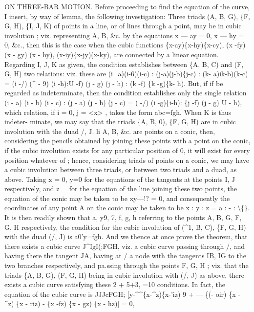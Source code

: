 \documentclass[12pt,a4paper]{article}
\begin{document}
ON THREE-BAR MOTION.
Before
proceeding
to
find
the
equation
of
the
curve,
I
insert,
by way of lemma,
the
following
investigation:
Three
triads
(A,
B,
G),
\{F,
G,
H),
\{I,
J, K)
of
points
in
a
line,
or
of
lines
through
a
point,
may
be
in
cubic
involution
;
viz.
representing A,
B,
\&c.
by
the
equations x --- ay = 0, x --- hy = 0,
\&c., then
this
is
the
case when the cubic
functions
\{x-ay)\{x-hy)\{x-cy),
(x -fy) (x - gy) (x - hy),
(x-iy)\{x-jy)(x-ky),
are
connected
by
a
linear
equation.
Regarding
I,
J, K
as
given,
the
condition
establishes between
\{A, B,
C) and
(F,
G, H) two
relations:
viz.
these
are
(i\_a)(i-6)(i-c)
: (j-a)(j-b)\{j-c)
: (k- a)ik-b)(k-c)
= (i -/) (\textasciicircum{} - 9) (i -h):U -f) (j - g) (j - h)
: (k -f) \{k -g)\{k- h).
But,
if
if
be
regarded
as
indeterminate,
then
the
condition
establishes
only
the
single
relation
(i - a) (i - b) (i - c)
:
(j - a) (j - b) (j - c)
=
(\guillemotright{}\textbullet{} -/) (i -g)\{i-h):
\{j -f) (j - g) U - h),
which
relation,
if
i = 0, j =
<x>
,
takes
the
form
abc=fgh.
When K
is
thus
indeter-
minate, we
may
say
that
the
triads
\{A,
B,
0),
\{F,
G, H)
are
in
cubic
involution
with the duad
/,
J.
li A,
B,
\&c.
are
points
on
a
conic,
then,
considering
the
pencils
obtained
by
joining
these
points
with
a
point
on
the
conic,
if
the
cubic
involution
exists
for
any
particular
position
of
0,
it
will
exist
for
every
position
whatever
of
;
hence,
considering
triads
of
points
on
a
conic, we
may
have
a
cubic
involution
between
three
triads, or between two
triads and a duad,
as above.
Taking x = 0, y=0
for the equations of the tangents at the points
I, J respectively,
and
z =
for
the
equation
of
the
line
joining
these
two
points,
the
equation
of
the
conic may
be
taken
to
be xy---!? = 0,
and
consequently
the
coordinates
of
any
point
A
on
the
conic may be
taken to
be
x
: y
: z = a
: -
:
\textbackslash\{\}.
It
is
then
readily
shown
that
a,
y9,
7, f, g, h referring
to
the
points A, B,
G, F,
G, H respectively, the condition
for the cubic involution
of (\textasciicircum{}1, B,
C), \{F,
G, H) with the duad
(/, J)
is a0'y=fgh.
And
we
thence
at
once
prove
the
theorem,
that
there
exists
a
cubic
curve
J\textasciicircum{}IgI(;FGH,
viz. a
cubic
curve
passing
through
/,
and
having
there
the
tangent JA,
having
at /
a
node
with
the
tangents
IB, IG
to
the
two
branches
respectively,
and
pa.ssing through
the points F,
G, H
;
viz.
that
the
triads \{A, B,
G),
(F,
G, H) being
in
cubic
involution
with
(/,
J)
as
above,
there
exists
a
cubic
curve
satisfying
these
2 + 5+3, =10
conditions.
In
fact, the equation of the cubic curve
is
JJJcFGH; [y-\textasciicircum{}\textasciicircum{}\{x-\textasciicircum{}z)\{x-'iz)
9
+ --- \{(\guillemotleft{}- oir) \{x - \textasciicircum{}z) \{x - riz) - \{x -fz) \{x - gz) \{x - hz)] = 0,
\end{document}
